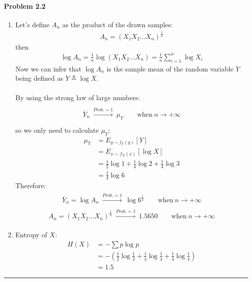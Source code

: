 \documentclass[12pt, letterpaper]{scrartcl}
\begin{document}
\paragraph*{Problem 2.2} \hfill\newline
\begin{enumerate}[((a))]
    \item Let's define $A_n$ as the product of the drawn samples:
    \begin{align*}
        A_n=(X_1X_2\dots X_n)^\frac{1}{n}
    \end{align*}
    then 
    \begin{align*}
        \log A_n=\frac{1}{n}\log(X_1X_2\dots X_n)=\frac{1}{n}\sum_{i=1}^n\log X_i
    \end{align*}
    Now we can infer that $\log A_n$ is the sample mean of the random variable $Y$ being defined as $Y\triangleq\log X$.\\\\
    By using the strong law of large numbers:
    \begin{align*}
        \begin{matrix}{}\\{\overline {Y}}_{n}\ {\xrightarrow {Prob.=1}}\ \mu_Y \qquad {\textrm {when}}\ n\to +\infty\\{}\end{matrix}
    \end{align*}
    so we only need to calculate $\mu_Y$:
    \begin{align*}
        \mu_Y&=E_{y\sim f_Y(y)}[Y]\\
        &=E_{x\sim f_X(x)}[\log X]\\
        &=\frac{1}{2}\log1+\frac{1}{4}\log2+\frac{1}{4}\log3\\
        &=\frac{1}{4}\log 6
    \end{align*}
    Therefore:
    \begin{align*}
        \begin{matrix}{}{\overline {Y}}_{n}=\log A_n\ {\xrightarrow {Prob.=1}}\ \log6^{\frac{1}{4}} \qquad {\textrm {when}}\ n\to +\infty{}\end{matrix}
    \end{align*}
    \begin{align*}
        \begin{matrix}{}{{A}}_{n}=(X_1X_2\dots X_n)^\frac{1}{n}\ {\xrightarrow {Prob.=1}}\ 1.5650 \qquad {\textrm {when}}\ n\to +\infty{}\end{matrix}
    \end{align*}
    
    \item Entropy of $X$:
    \begin{align*}
        H(X)&=-\sum p\log p\\
        &=-(\frac{1}{2}\log\frac{1}{2}+\frac{1}{4}\log\frac{1}{4}+\frac{1}{4}\log\frac{1}{4})\\
        &=1.5
    \end{align*}
\end{enumerate}
\hrule
\end{document}
